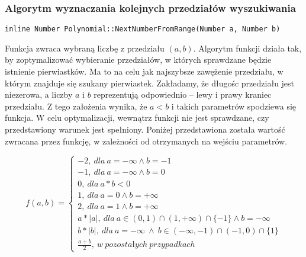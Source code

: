 \documentclass[twoside,a4paper]{book}
\begin{document}
\subsubsection{Algorytm wyznaczania kolejnych przedziałów wyszukiwania}
\begin{lstlisting}
inline Number Polynomial::NextNumberFromRange(Number a, Number b)
\end{lstlisting}

Funkcja zwraca wybraną liczbę z przedziału $(a,b)$. Algorytm funkcji działa tak, by zoptymalizować wybieranie przedziałów, w których sprawdzane będzie istnienie pierwiastków. Ma to na celu jak najszybsze zawężenie przedziału, w którym znajduje się szukany pierwiastek. Zakładamy, że długośc przedziału jest niezerowa, a liczby $a$ i $b$ reprezentują odpowiednio -- lewy i prawy kraniec przedziału. Z tego założenia wynika, że $a<b$ i takich parametrów spodziewa się funkcja. W celu optymalizacji, wewnątrz funkcji nie jest sprawdzane, czy przedstawiony warunek jest spełniony. Poniżej przedstawiona została wartość zwracana przez funkcję, w zależności od otrzymanych na wejściu parametrów.

\[
f(a,b)=\left\{
\begin{array}{ll}
-2,\ dla\ a=-\infty \wedge b=-1\\
-1,\ dla\ a=-\infty \wedge b=0\\
0,\ dla\ a*b<0\\
1,\ dla\ a=0 \wedge b=+\infty\\
2,\ dla\ a=1 \wedge b=+\infty\\
a*|a|,\ dla\ a \in (0,1) \cap (1,+\infty) \cap \{-1\} \wedge b=-\infty\ \\
b*|b|,\ dla\ a=-\infty\ \wedge \ b \in (-\infty,-1) \cap (-1,0) \cap \{1\}\\
\frac{a+b}{2},\ w\ pozostałych\ przypadkach
\end{array}
\right.
\]
\end{document}

